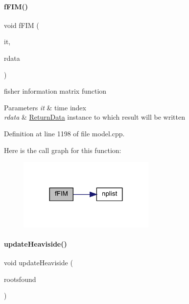 \paragraph{\texorpdfstring{f\+F\+I\+M()}{fFIM()}}
{\footnotesize\ttfamily void f\+F\+IM (\begin{DoxyParamCaption}\item[{const int}]{it,  }\item[{\mbox{\hyperlink{classamici_1_1_return_data}{Return\+Data}} $\ast$}]{rdata }\end{DoxyParamCaption})}

fisher information matrix function 
\begin{DoxyParams}{Parameters}
{\em it} & time index \\
\hline
{\em rdata} & \mbox{\hyperlink{classamici_1_1_return_data}{Return\+Data}} instance to which result will be written \\
\hline
\end{DoxyParams}


Definition at line 1198 of file model.\+cpp.

Here is the call graph for this function\+:
\nopagebreak
\begin{figure}[H]
\begin{center}
\leavevmode
\includegraphics[width=191pt]{classamici_1_1_model_aba7a1237e503813d9ec7ca56413f1e1d_cgraph}
\end{center}
\end{figure}
\mbox{\label{classamici_1_1_model_ae053072690046bd24225447de93a9e84}} 
\paragraph{\texorpdfstring{update\+Heaviside()}{updateHeaviside()}}
{\footnotesize\ttfamily void update\+Heaviside (\begin{DoxyParamCaption}\item[{const std\+::vector$<$ int $>$ \&}]{rootsfound }\end{DoxyParamCaption})}

